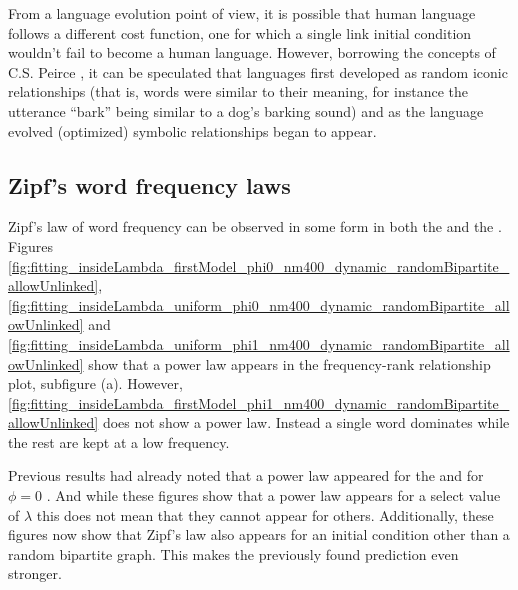 From a language evolution point of view, it is possible that human language follows a different cost function, one for which a single link initial condition wouldn't fail to become a human language.
However, borrowing the concepts of C.S. Peirce \cite{Atkin2010a}, it can be speculated that languages first developed as random iconic relationships (that is, words were similar to their meaning, for instance the utterance ``bark'' being similar to a dog's barking sound) and as the language evolved (optimized) symbolic relationships began to appear.



\subsection{Zipf's word frequency laws}
\label{sec:discussion_math_word-freq}

Zipf's law of word frequency can be observed in some form in both the \firstmodel{} and the \secondmodel{}.
Figures \ref{fig:fitting_insideLambda_firstModel_phi0_nm400_dynamic_randomBipartite_allowUnlinked}, \ref{fig:fitting_insideLambda_uniform_phi0_nm400_dynamic_randomBipartite_allowUnlinked} and \ref{fig:fitting_insideLambda_uniform_phi1_nm400_dynamic_randomBipartite_allowUnlinked} show that a power law appears in the frequency-rank relationship plot, subfigure (a).
However, \ref{fig:fitting_insideLambda_firstModel_phi1_nm400_dynamic_randomBipartite_allowUnlinked} does not show a power law.
Instead a single word dominates while the rest are kept at a low frequency.

Previous results had already noted that a power law appeared for the \firstm{} and \secondmodel{} for $\phi=0$ \cite{Ferrer2005a} \cite{Ferrer2003a}.
And while these figures show that a power law appears for a select value of $\lambda$ this does not mean that they cannot appear for others.
Additionally, these figures now show that Zipf's law also appears for an initial condition other than a random bipartite graph.
This makes the previously found prediction even stronger.

